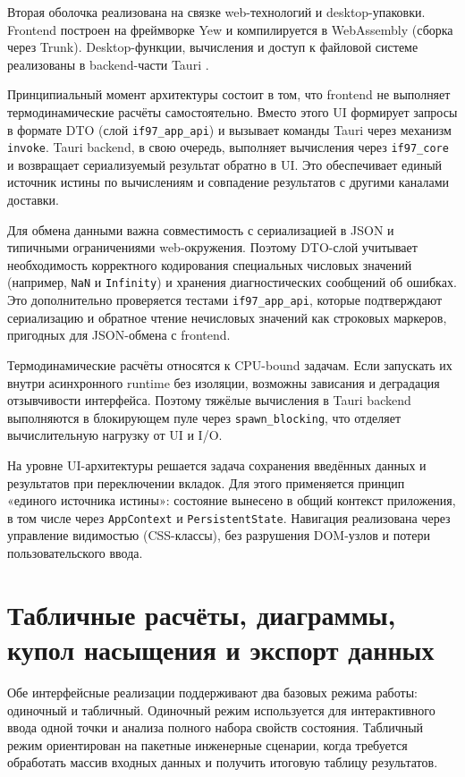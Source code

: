 Вторая оболочка реализована на связке web-технологий и desktop-упаковки.
Frontend построен на фреймворке Yew и компилируется в WebAssembly
(сборка через Trunk).
Desktop-функции, вычисления и доступ к файловой системе
реализованы в backend-части Tauri \cite{tauri_docs}.  

Принципиальный момент архитектуры состоит в том,
что frontend не выполняет термодинамические расчёты самостоятельно.  
Вместо этого UI формирует запросы в формате DTO (слой \texttt{if97\_app\_api}) и вызывает команды Tauri через механизм \texttt{invoke}.  
Tauri backend, в свою очередь, выполняет вычисления через \texttt{if97\_core} и возвращает сериализуемый результат обратно в UI.  
Это обеспечивает единый источник истины по вычислениям и совпадение результатов с другими каналами доставки.  

Для обмена данными важна совместимость с сериализацией в JSON и типичными ограничениями web-окружения.  
Поэтому DTO-слой учитывает необходимость корректного кодирования специальных числовых значений (например, \texttt{NaN} и \texttt{Infinity})
и хранения диагностических сообщений об ошибках.  
Это дополнительно проверяется тестами \texttt{if97\_app\_api},
которые подтверждают сериализацию и обратное чтение
нечисловых значений как строковых маркеров,
пригодных для JSON-обмена с frontend.

Термодинамические расчёты относятся к CPU-bound задачам.  
Если запускать их внутри асинхронного runtime без изоляции,
возможны зависания и деградация отзывчивости интерфейса.  
Поэтому тяжёлые вычисления в Tauri backend выполняются в блокирующем пуле через \texttt{spawn\_blocking},
что отделяет вычислительную нагрузку от UI и I/O.  

На уровне UI-архитектуры решается задача сохранения введённых данных и результатов при переключении вкладок.  
Для этого применяется принцип «единого источника истины»: состояние вынесено в общий контекст приложения,
в том числе через \texttt{AppContext} и \texttt{PersistentState}.
Навигация реализована через управление видимостью (CSS-классы),
без разрушения DOM-узлов и потери пользовательского ввода.  

\section{Табличные расчёты, диаграммы, купол насыщения и экспорт данных}

Обе интерфейсные реализации поддерживают два базовых режима работы: одиночный и табличный.  
Одиночный режим используется для интерактивного ввода одной точки и анализа полного набора свойств состояния.  
Табличный режим ориентирован на пакетные инженерные сценарии,
когда требуется обработать массив входных данных и получить итоговую таблицу результатов.  

